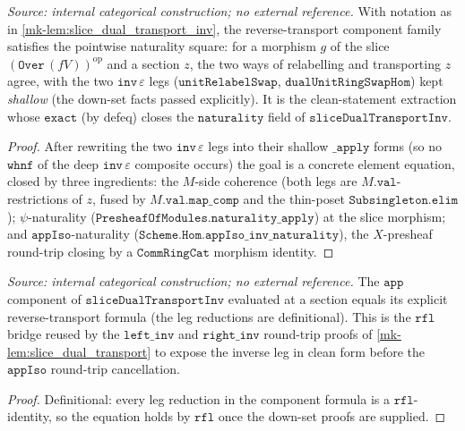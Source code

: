 \begin{lemma}\label{mk-lem:slice_dual_transport_inv_naturality_apply}
  \leanok

  \textit{Source: internal categorical construction; no external reference.}
  With notation as in \ref{mk-lem:slice_dual_transport_inv}, the reverse-transport component
  family satisfies the pointwise naturality square: for a morphism \(g\) of the slice
  \((\mathtt{Over}\,(fV))^{\mathrm{op}}\) and a section \(z\), the two ways of relabelling
  and transporting \(z\) agree, with the two \(\mathtt{inv}\,\varepsilon\) legs
  (\(\mathtt{unitRelabelSwap}\), \(\mathtt{dualUnitRingSwapHom}\)) kept \emph{shallow} (the
  down-set facts passed explicitly). It is the clean-statement extraction whose \(\mathtt{exact}\)
  (by defeq) closes the \(\mathtt{naturality}\) field of \(\mathtt{sliceDualTransportInv}\).
\end{lemma}
\begin{proof}
  \leanok
  After rewriting the two \(\mathtt{inv}\,\varepsilon\) legs into their shallow \(\mathtt{\_apply}\)
  forms (so no \(\mathtt{whnf}\) of the deep \(\mathtt{inv}\,\varepsilon\) composite occurs) the
  goal is a concrete element equation, closed by three ingredients: the \(M\)-side coherence
  (both legs are \(M.\mathtt{val}\)-restrictions of \(z\), fused by \(M.\mathtt{val}.\mathtt{map\_comp}\)
  and the thin-poset \(\mathtt{Subsingleton.elim}\)); \(\psi\)-naturality
  (\(\mathtt{PresheafOfModules.naturality\_apply}\)) at the slice morphism; and
  \(\mathtt{appIso}\)-naturality (\(\mathtt{Scheme.Hom.appIso\_inv\_naturality}\)), the
  \(X\)-presheaf round-trip closing by a \(\mathtt{CommRingCat}\) morphism identity.
\end{proof}

\begin{lemma}\label{mk-lem:slice_dual_transport_inv_app_apply}
  \leanok

  \textit{Source: internal categorical construction; no external reference.}
  The \(\mathtt{app}\) component of \(\mathtt{sliceDualTransportInv}\) evaluated at a section
  equals its explicit reverse-transport formula (the leg reductions are definitional). This
  is the \(\mathtt{rfl}\) bridge reused by the \(\mathtt{left\_inv}\) and \(\mathtt{right\_inv}\)
  round-trip proofs of \ref{mk-lem:slice_dual_transport} to expose the inverse leg in clean form
  before the \(\mathtt{appIso}\) round-trip cancellation.
\end{lemma}
\begin{proof}
  \leanok
  Definitional: every leg reduction in the component formula is a \(\mathtt{rfl}\)-identity, so
  the equation holds by \(\mathtt{rfl}\) once the down-set proofs are supplied.
\end{proof}

